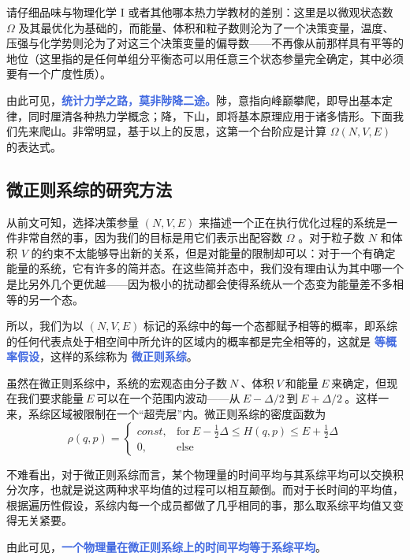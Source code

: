 请仔细品味与物理化学 I 或者其他哪本热力学教材的差别：这里是以微观状态数 $\Omega$ 及其最优化为基础的，而能量、体积和粒子数则沦为了一个决策变量，温度、压强与化学势则沦为了对这三个决策变量的偏导数——不再像从前那样具有平等的地位（这里指的是任何单组分平衡态可以用任意三个状态参量完全确定，其中必须要有一个广度性质）。

由此可见，\textcolor{RoyalBlue}{\textbf{\kaishu 统计力学之路，莫非陟降二途。}}陟，意指向峰巅攀爬，即导出基本定律，同时厘清各种热力学概念；降，下山，即将基本原理应用于诸多情形。下面我们先来爬山。非常明显，基于以上的反思，这第一个台阶应是计算 $\Omega (N,V,E)$ 的表达式。 


\subsection{微正则系综的研究方法}

从前文可知，选择决策参量 $(N,V,E)$ 来描述一个正在执行优化过程的系统是一件非常自然的事，因为我们的目标是用它们表示出配容数 $\Omega$ 。对于粒子数 $N$ 和体积 $V$ 的约束不太能够导出新的关系，但是对能量的限制却可以：对于一个有确定能量的系统，它有许多的简并态。在这些简并态中，我们没有理由认为其中哪一个是比另外几个更优越——因为极小的扰动都会使得系统从一个态变为能量差不多相等的另一个态。

所以，我们为以 $(N,V,E)$ 标记的系综中的每一个态都赋予相等的概率，即系综的任何代表点处于相空间中所允许的区域内的概率都是完全相等的，这就是 \textcolor{RoyalBlue}{\textbf{\kaishu 等概率假设}}，这样的系综称为 \textcolor{RoyalBlue}{\textbf{\kaishu 微正则系综}}。

虽然在微正则系综中，系统的宏观态由分子数$~N~$、体积$~V~$和能量$~E~$来确定，但现在我们要求能量$~E~$可以在一个范围内波动——从$~E -\Delta/2~$到$~E + \Delta/2~$。这样一来，系综区域被限制在一个“超壳层”内。微正则系综的密度函数为
\begin{equation}
\rho(q, p) = \begin{cases}const, & \text{for}~E - \displaystyle\frac{1}{2}\Delta \le H(q, p) \le E + \displaystyle\frac{1}{2}\Delta \\
0, &\text{else}
\end{cases}
\end{equation}

不难看出，对于微正则系综而言，某个物理量的时间平均与其系综平均可以交换积分次序，也就是说这两种求平均值的过程可以相互颠倒。而对于长时间的平均值，根据遍历性假设，系综内每一个成员都做了几乎相同的事，那么取系综平均值又变得无关紧要\cite{Pathria}。

由此可见，\textcolor{RoyalBlue}{\textbf{\kaishu 一个物理量在微正则系综上的时间平均等于系综平均}}。

